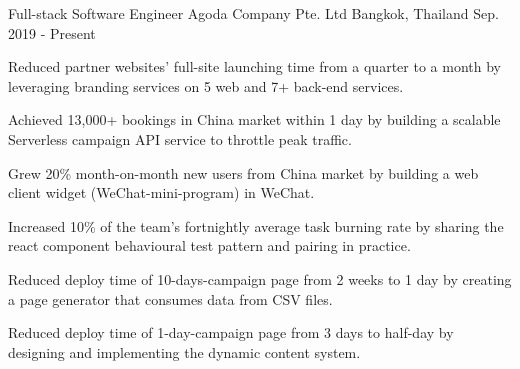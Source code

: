 

\begin{cventries}

  \cventry
  {Full-stack Software Engineer} %
  {Agoda Company Pte. Ltd} %
  {Bangkok, Thailand} %
  {Sep. 2019 - Present} %
  {
    \begin{cvitems} %
      \item {Reduced partner websites' full-site launching time from a quarter to a month by leveraging branding services on 5 web and 7+ back-end services.}
      \item {Achieved 13,000+ bookings in China market within 1 day by building a scalable Serverless campaign API service to throttle peak traffic.}
      \item {Grew 20\% month-on-month new users from China market by building a web client widget (WeChat-mini-program) in WeChat.}
      \item {Increased 10\% of the team's fortnightly average task burning rate by sharing the react component behavioural test pattern and pairing in practice.}
      \item {Reduced deploy time of 10-days-campaign page from 2 weeks to 1 day by creating a page generator that consumes data from CSV files.}
      \item {Reduced deploy time of 1-day-campaign page from 3 days to half-day by designing and implementing the dynamic content system.}
    \end{cvitems}
  }


\end{cventries}
